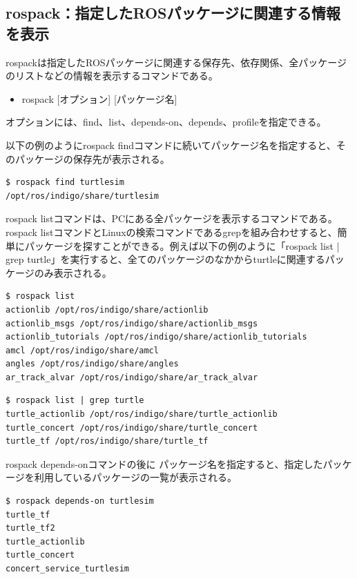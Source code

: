 \subsection{rospack：指定したROSパッケージに関連する情報を表示}

rospackは指定したROSパッケージに関連する保存先、依存関係、全パッケージのリストなどの情報を表示するコマンドである。

\begin{itemize}
\item  rospack [オプション] [パッケージ名]
\end{itemize}

オプションには、find、list、depends-on、depends、profileを指定できる。

以下の例のようにrospack findコマンドに続いてパッケージ名を指定すると、そのパッケージの保存先が表示される。

\begin{lstlisting}[language=ROS]
$ rospack find turtlesim
/opt/ros/indigo/share/turtlesim
\end{lstlisting}

rospack listコマンドは、PCにある全パッケージを表示するコマンドである。rospack listコマンドとLinuxの検索コマンドであるgrepを組み合わせすると、簡単にパッケージを探すことができる。例えば以下の例のように「rospack list | grep turtle」を実行すると、全てのパッケージのなかからturtleに関連するパッケージのみ表示される。

\begin{lstlisting}[language=ROS]
$ rospack list
actionlib /opt/ros/indigo/share/actionlib
actionlib_msgs /opt/ros/indigo/share/actionlib_msgs
actionlib_tutorials /opt/ros/indigo/share/actionlib_tutorials
amcl /opt/ros/indigo/share/amcl
angles /opt/ros/indigo/share/angles
ar_track_alvar /opt/ros/indigo/share/ar_track_alvar
\end{lstlisting}

\begin{lstlisting}[language=ROS]
$ rospack list | grep turtle
turtle_actionlib /opt/ros/indigo/share/turtle_actionlib
turtle_concert /opt/ros/indigo/share/turtle_concert
turtle_tf /opt/ros/indigo/share/turtle_tf
\end{lstlisting}

rospack depends-onコマンドの後に パッケージ名を指定すると、指定したパッケージを利用しているパッケージの一覧が表示される。

\begin{lstlisting}[language=ROS]
$ rospack depends-on turtlesim
turtle_tf
turtle_tf2
turtle_actionlib
turtle_concert
concert_service_turtlesim
\end{lstlisting}

